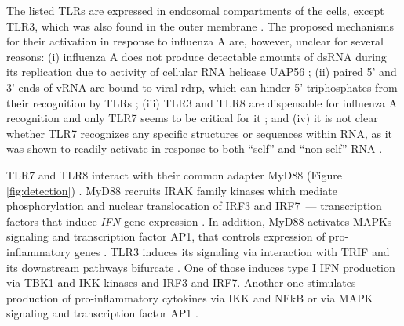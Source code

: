 		The listed \gls{TLR}s are expressed in endosomal compartments of the cells, except \gls{TLR}3, which was also found in the outer membrane \parencite{Schulz2005, Ablasser2009, Diebold2004}. The proposed mechanisms for their activation in response to influenza A are, however, unclear for several reasons: (i) influenza A does not produce detectable amounts of dsRNA during its replication due to activity of cellular RNA helicase UAP56 \parencite{Wisskirchen2011}; (ii) paired 5' and 3' ends of vRNA are bound to viral \gls{rdrp}, which can hinder 5' triphosphates from their recognition by \glspl{TLR} \parencite{Arranz2012}; (iii) \gls{TLR}3 and \gls{TLR}8 are dispensable for influenza A recognition and only \gls{TLR}7 seems to be critical for it \parencite{Lund2004}; and (iv) it is not clear whether \gls{TLR}7 recognizes any specific structures or sequences within RNA, as it was shown to readily activate in response to both ``self'' and ``non-self'' RNA \parencite{Diebold2004}.
		
		
				
		TLR7 and TLR8 interact with their common adapter MyD88 (Figure \ref{fig:detection}) \parencite{Medzhitov1998}. MyD88 recruits IRAK family kinases which mediate phosphorylation and nuclear translocation of \gls{IRF}3 and \gls{IRF}7~--- transcription factors that induce \textit{\gls{IFN}} gene expression \parencite{Burns2003, Honda2005a}. In addition, MyD88 activates \glspl{MAPK} signaling and transcription factor \gls{AP1}, that controls expression of pro-inflammatory genes \parencite{Kawai2007}. TLR3 induces its signaling via interaction with \gls{TRIF} and its downstream pathways bifurcate \parencite{Guillot2005, Kumar2009}. One of those induces type I \gls{IFN} production via TBK1 and \gls{IKK} kinases and \gls{IRF}3 and \gls{IRF}7. Another one stimulates production of pro-inflammatory cytokines via \gls{IKK} and \gls{NFkB} or via \gls{MAPK} signaling and transcription factor \gls{AP1} \parencite{Guillot2005, Vercammen2008}.  
		 
